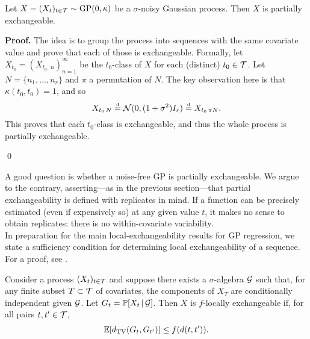 \begin{proposition} \label{prop:GP_partial_exch}
	Let $X = (X_t)_{t \in \mathcal{T}} \sim \mathrm{GP} (0, \kappa)$ be a $\sigma$-noisy Gaussian process. Then $X$ is partially exchangeable.
\end{proposition}

\textbf{Proof. \hspace{0.05cm}} The idea is to group the process into sequences with the same covariate value and prove that each of those is exchangeable. Formally, let $X_{t_0} = (X_{t_0, \, n})_{n=1}^{\infty}$ be the $t_0$-class of $X$ for each (distinct) $t_0 \in \mathcal{T}$. Let $N = \{n_1, ..., n_r \}$ and $\pi$ a permutation of $N$. The key observation here is that $\kappa(t_0, t_0) = 1$, and so
\begin{equation} \label{eq:GP_partial_exchangeability}
	X_{t_0 \, N} \stackrel{\text{\rm\tiny d}}{=} \mathcal{N} (0, (1+\sigma^2) I_r) \stackrel{\text{\rm\tiny d}}{=} X_{t_0 \, \pi N}.
\end{equation}
This proves that each $t_0$-class is exchangeable, and thus the whole process is partially exchangeable.

\qed

\vskip 0.2cm

A good question is whether a noise-free GP is partially exchangeable. We argue to the contrary, asserting---as in the previous section---that partial exchangeability is defined with replicates in mind. If a function can be precisely estimated (even if expensively so) at any given value $t$, it makes no sense to obtain replicates: there is no within-covariate variability. 
\\




In preparation for the main local-exchangeability results for GP regression, we state a sufficiency condition for determining local exchangeability of a sequence. For a proof, see \cite[][Proposition 3]{CampbellEtAl:2019:LocalExch}.

\begin{proposition} \label{prop:sufficient_local_exchangeability}
	Consider a process $(X_t)_{t \in \mathcal{T}}$ and suppose there exists a $\sigma$-algebra $\mathcal{G}$ such that, for any finite subset $T \subset \mathcal{T}$ of covariates, the components of $X_T$ are conditionally independent given $\mathcal{G}$. Let $G_t = \mathbb{P} [X_t \, | \, \mathcal{G} ]$. Then $X$ is $f$-locally exchangeable if, for all pairs $t, t' \in \mathcal{T}$,
	\begin{equation} \label{eq:sufficient_local_exchangeability}
		\mathbb{E}[d_{\mathrm{TV}} (G_t , G_{t'} ) ] \leq f(d(t, t')).
	\end{equation}
\end{proposition}

